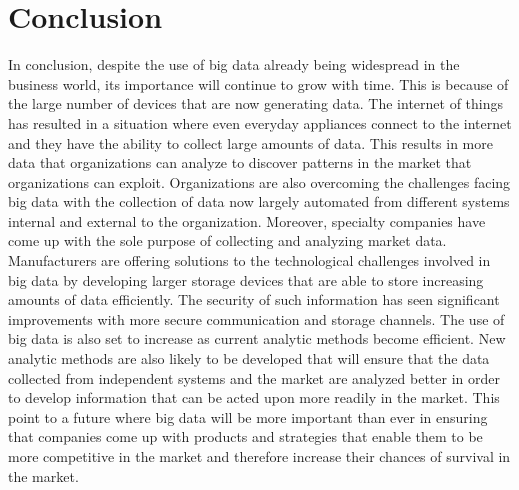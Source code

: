 \documentclass[sigconf]{acmart}
\begin{document}
\section{Conclusion}
In conclusion, despite the use of big data already being widespread in the business world, its importance will continue to grow with time. This is because of the large number of devices that are now generating data. The internet of things has resulted in a situation where even everyday appliances connect to the internet and they have the ability to collect large amounts of data. This results in more data that organizations can analyze to discover patterns in the market that organizations can exploit. Organizations are also overcoming the challenges facing big data with the collection of data now largely automated from different systems internal and external to the organization. 
Moreover, specialty companies have come up with the sole purpose of collecting and analyzing market data. Manufacturers are offering solutions to the technological challenges involved in big data by developing larger storage devices that are able to store increasing amounts of data efficiently. The security of such information has seen significant improvements with more secure communication and storage channels. The use of big data is also set to increase as current analytic methods become efficient. New analytic methods are also likely to be developed that will ensure that the data collected from independent systems and the market are analyzed better in order to develop information that can be acted upon more readily in the market. This point to a future where big data will be more important than ever in ensuring that companies come up with products and strategies that enable them to be more competitive in the market and therefore increase their chances of survival in the market.
\end{document}
